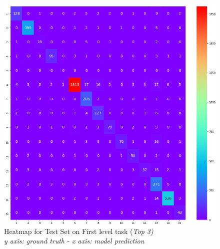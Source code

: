 \documentclass[12pt]{article}
\begin{document}
\begin{figure}[ht!]
        \begin{adjustwidth}{-3.2cm}{}
    	    \begin{center}
        \includegraphics[width=1.45\textwidth]{heatmap3.png}
            \end{center}
	    \end{adjustwidth}
	    \captionsetup{justification   = centering}
        \caption{Heatmap for Test Set on First level task (\textit{Top 3) \\y axis: \textit{ground truth} - x axis: \textit{model prediction}}}
        \label{fig:heatfirst3}
\end{figure}
\end{document}
